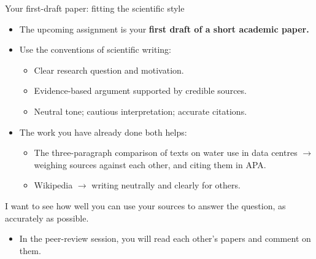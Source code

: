 \documentclass[aspectratio=169]{beamer}
\begin{document}
\begin{frame}{Your first-draft paper: fitting the scientific style}
\begin{itemize}
\item The upcoming assignment is your \textbf{first draft of a short academic paper.}
 
  \item Use the conventions of scientific writing:
    \begin{itemize}
      \item Clear research question and motivation.  
      \item Evidence-based argument supported by credible sources.  
      \item Neutral tone; cautious interpretation; accurate citations.
    \end{itemize}
  \item The work you have already done both helps:
    \begin{itemize}
      \item The three-paragraph comparison of texts on water use in data centres
        $\rightarrow$ weighing sources against each other, and citing them in APA.
      \item Wikipedia $\rightarrow$ writing neutrally and clearly for others.
    \end{itemize}
\end{itemize}

I want to see how well you can use your sources to answer the question, as accurately as possible.

\begin{itemize}
\item In the peer-review session, you will read each other's papers and comment on them.
\end{itemize}

\end{frame}

\end{document}
